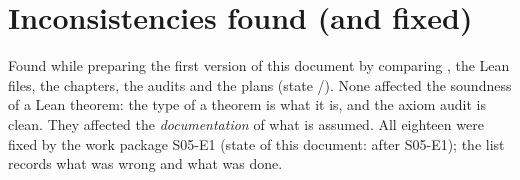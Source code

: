\section{Inconsistencies found (and fixed)}\label{sec:hyp-incons}

Found while preparing the first version of this document by comparing , the Lean files, the chapters,
the audits and the plans (state /). None affected the soundness of a Lean theorem: the type
of a theorem is what it is, and the axiom audit is clean. They affected the \emph{documentation} of what is assumed. All
eighteen were fixed by the work package S05-E1 (state of this document: after S05-E1); the list records what was wrong
and what was done.
